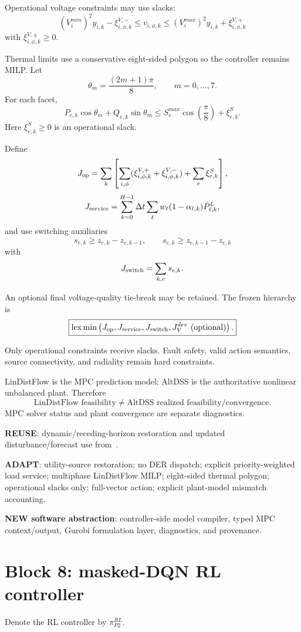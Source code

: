 \documentclass[11pt]{article}
\newcommand{\lexmin}{\operatorname*{lex\,min}}
\begin{document}
Operational voltage constraints may use slacks:
\[
\boxed{
(V_i^{min})^2y_{i,k}-\xi_{i,\phi,k}^{V,-}
\le
v_{i,\phi,k}
\le
(V_i^{max})^2y_{i,k}+\xi_{i,\phi,k}^{V,+}}
\]
with $\xi_{i,\phi,k}^{V,\pm}\ge0$.

Thermal limits use a conservative eight-sided polygon so the controller remains MILP.
Let
\[
\theta_m=\frac{(2m+1)\pi}{8},\qquad m=0,\dots,7.
\]
For each facet,
\[
\boxed{
P_{e,k}\cos\theta_m+Q_{e,k}\sin\theta_m
\le
S_e^{max}\cos\left(\frac{\pi}{8}\right)+\xi_{e,k}^{S}.}
\]
Here $\xi_{e,k}^{S}\ge0$ is an operational slack.

Define
\[
J_{\rm op}
=
\sum_k\left[
\sum_{i,\phi}
(\xi_{i,\phi,k}^{V,+}+\xi_{i,\phi,k}^{V,-})
+
\sum_e\xi_{e,k}^{S}
\right],
\]
\[
J_{\rm service}
=
\sum_{k=0}^{H-1}\Delta t
\sum_\ell
w_\ell(1-\alpha_{\ell,k})\hat P_{\ell,k}^{L},
\]
and use switching auxiliaries
\[
s_{e,k}\ge z_{e,k}-z_{e,k-1},\qquad
s_{e,k}\ge z_{e,k-1}-z_{e,k}
\]
with
\[
J_{\rm switch}=\sum_{k,e}s_{e,k}.
\]

An optional final voltage-quality tie-break may be retained. The frozen hierarchy is
\[
\boxed{
\lexmin\left(
J_{\rm op},
J_{\rm service},
J_{\rm switch},
J_V^{dev}\ {\rm(optional)}
\right).}
\]

Only operational constraints receive slacks. Fault safety, valid action semantics,
source connectivity, and radiality remain hard constraints.

LinDistFlow is the MPC prediction model; AltDSS is the authoritative nonlinear
unbalanced plant. Therefore
\[
\boxed{
\text{LinDistFlow feasibility}\neq
\text{AltDSS realized feasibility/convergence}.}
\]
MPC solver status and plant convergence are separate diagnostics.

\textbf{REUSE}: dynamic/receding-horizon restoration and updated disturbance/forecast
use from~\cite{Liu2020}.

\textbf{ADAPT}: utility-source restoration; no DER dispatch; explicit priority-weighted
load service; multiphase LinDistFlow MILP; eight-sided thermal polygon; operational
slacks only; full-vector action; explicit plant-model mismatch accounting.

\textbf{NEW software abstraction}: controller-side model compiler, typed MPC
context/output, Gurobi formulation layer, diagnostics, and provenance.

\section{Block 8: masked-DQN RL controller}
Denote the RL controller by $\pi_{P2}^{RL}$.
\end{document}
